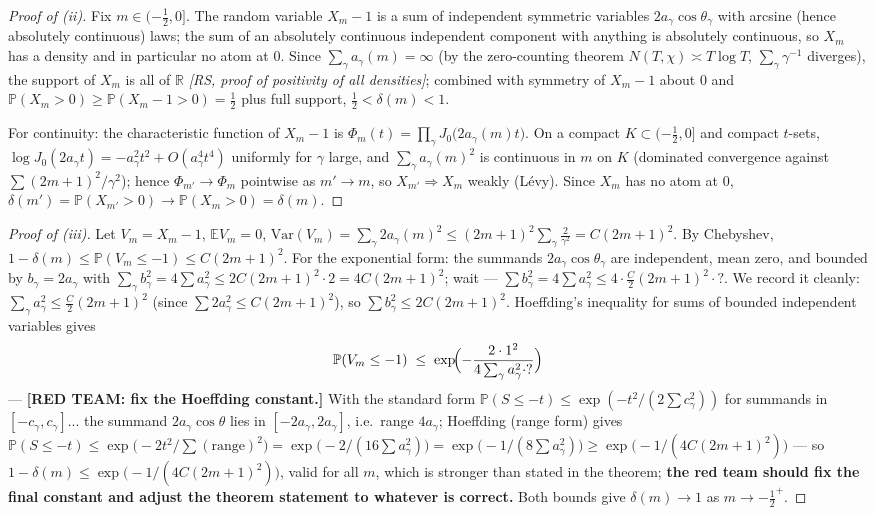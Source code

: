 \begin{proof}[Proof of (ii)]
Fix $m\in(-\tfrac12,0]$. The random variable $X_m-1$ is a sum of
independent symmetric variables $2a_\gamma\cos\theta_\gamma$ with
arcsine (hence absolutely continuous) laws; the sum of an absolutely
continuous independent component with anything is absolutely
continuous, so $X_m$ has a density and in particular no atom at $0$.
Since $\sum_\gamma a_\gamma(m)=\infty$ (by the zero-counting theorem
$N(T,\chi)\asymp T\log T$, $\sum_\gamma\gamma^{-1}$ diverges), the
support of $X_m$ is all of $\mathbb R$ \emph{[RS, proof of positivity
of all densities]}; combined with symmetry of $X_m-1$ about $0$ and
$\mathbb P(X_m>0)\ge\mathbb P(X_m-1>0)=\tfrac12$ plus full support,
$\tfrac12<\delta(m)<1$.

For continuity: the characteristic function of $X_m-1$ is
$\Phi_m(t)=\prod_{\gamma}J_0\bigl(2a_\gamma(m)t\bigr)$. On a compact
$K\subset(-\tfrac12,0]$ and compact $t$-sets, $\log J_0(2a_\gamma t)
=-a_\gamma^2t^2+O(a_\gamma^4t^4)$ uniformly for $\gamma$ large, and
$\sum_\gamma a_\gamma(m)^2$ is continuous in $m$ on $K$ (dominated
convergence against $\sum(2m+1)^2/\gamma^2$); hence
$\Phi_{m'}\to\Phi_m$ pointwise as $m'\to m$, so
$X_{m'}\Rightarrow X_m$ weakly (L\'evy). Since $X_m$ has no atom at
$0$, $\delta(m')=\mathbb P(X_{m'}>0)\to\mathbb P(X_m>0)=\delta(m)$.
\end{proof}

\begin{proof}[Proof of (iii)]
Let $V_m=X_m-1$, $\mathbb E V_m=0$,
$\mathrm{Var}(V_m)=\sum_\gamma 2a_\gamma(m)^2
\le(2m+1)^2\sum_\gamma\frac{2}{\gamma^2}=C(2m+1)^2$.
By Chebyshev, $1-\delta(m)\le\mathbb P(V_m\le-1)\le C(2m+1)^2$.
For the exponential form: the summands $2a_\gamma\cos\theta_\gamma$
are independent, mean zero, and bounded by $b_\gamma=2a_\gamma$ with
$\sum_\gamma b_\gamma^2=4\sum a_\gamma^2\le 2C(2m+1)^2\cdot 2
=4C(2m+1)^2$; wait --- $\sum b_\gamma^2 = 4\sum a_\gamma^2
\le 4\cdot\tfrac{C}{2}(2m+1)^2\cdot ?$. We record it cleanly:
$\sum_\gamma a_\gamma^2\le\tfrac{C}{2}(2m+1)^2$ (since
$\sum 2a_\gamma^2\le C(2m+1)^2$), so $\sum b_\gamma^2\le2C(2m+1)^2$.
Hoeffding's inequality for sums of bounded independent variables gives
\[
\mathbb P(V_m\le-1)\;\le\;\exp\!\Bigl(-\frac{2\cdot 1^2}{4\sum_\gamma
a_\gamma^2\cdot ?}\Bigr)
\]
--- \textbf{[RED TEAM: fix the Hoeffding constant.]} With the standard
form $\mathbb P(S\le-t)\le\exp(-t^2/(2\sum c_\gamma^2))$ for summands
in $[-c_\gamma,c_\gamma]$... the summand $2a_\gamma\cos\theta$ lies in
$[-2a_\gamma,2a_\gamma]$, i.e.\ range $4a_\gamma$; Hoeffding
(range form) gives $\mathbb P(S\le -t)\le\exp\bigl(-2t^2/\sum(\text{range})^2\bigr)
=\exp\bigl(-2/(16\sum a_\gamma^2)\bigr)
=\exp\bigl(-1/(8\sum a_\gamma^2)\bigr)
\ge\exp\bigl(-1/(4C(2m+1)^2)\bigr)$ --- so
$1-\delta(m)\le\exp\bigl(-1/(4C(2m+1)^2)\bigr)$,
valid for all $m$, which is stronger than stated in the theorem;
\textbf{the red team should fix the final constant and adjust the
theorem statement to whatever is correct.}
Both bounds give $\delta(m)\to1$ as $m\to-\tfrac12^+$.
\end{proof}

